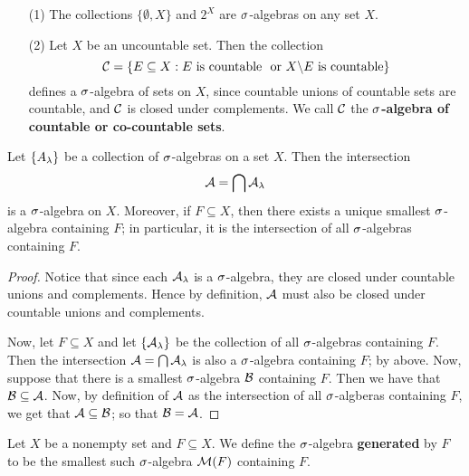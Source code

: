 \begin{example}\label{example_1.1}
    \begin{enumerate}
        \item[(1)] The collections $\{\emptyset, X\}$ and $2^X$ are
            $\sigma$-algebras on any set $X$.

        \item[(2)] Let $X$ be an uncountable set. Then the collection
            \begin{equation*}
                \mathcal{C}=\{E \subseteq X : E \text{ is countable } \text{ or }
                X \backslash E \text{ is countable}\}
            \end{equation*}
            defines a $\sigma$-algebra of sets on $X$, since countable unions of
            countable sets are countable, and $\mathcal{C}$ is closed under complements.
            We call $\mathcal{C}$ the \textbf{$\sigma$-algebra of countable or co-countable
            sets}.
    \end{enumerate}
\end{example}

\begin{lemma}\label{lemma_1.1.3}
    Let $\{A_\lambda\}$ be a collection of $\sigma$-algebras on a set  $X$. Then the
    intersection
    \begin{equation*}
        \mathcal{A}=\bigcap{\mathcal{A}_\lambda}
    \end{equation*}
    is a $\sigma$-algebra on $X$. Moreover, if $F \subseteq X$, then there exists a
    unique smallest $\sigma$-algebra containing $F$; in particular, it is the
    intersection of all  $\sigma$-algebras containing  $F$.
\end{lemma}
\begin{proof}
    Notice that since each $\mathcal{A}_\lambda$ is a  $\sigma$-algebra, they are closed under
    countable unions and complements. Hence by definition,  $\mathcal{A}$ must also be
    closed under countable unions and complements.

    Now, let $F \subseteq X$ and let $\{\mathcal{A}_\lambda\}$ be the collection of all
    $\sigma$-algebras containing $F$. Then the intersection $\mathcal{A}=\bigcap{\mathcal{A}_\lambda}$ is
    also a $\sigma$-algebra containing  $F$; by above. Now, suppose that there is a
    smallest $\sigma$-algebra $\mathcal{B}$ containing $F$. Then we have that $\mathcal{B} \subseteq
    \mathcal{A}$. Now, by definition of  $\mathcal{A}$ as the intersection of all  $\sigma$-algberas
    containing  $F$, we get that  $\mathcal{A} \subseteq \mathcal{B}$; so that $\mathcal{B}=\mathcal{A}$.
\end{proof}

\begin{definition}
    Let $X$ be a nonempty set and  $F \subseteq X$. We define the $\sigma$-algebra
    \textbf{generated} by $F$ to be the smallest such $\sigma$-algebra $\mathcal{M}(F)$
    containing $F$.
\end{definition}

